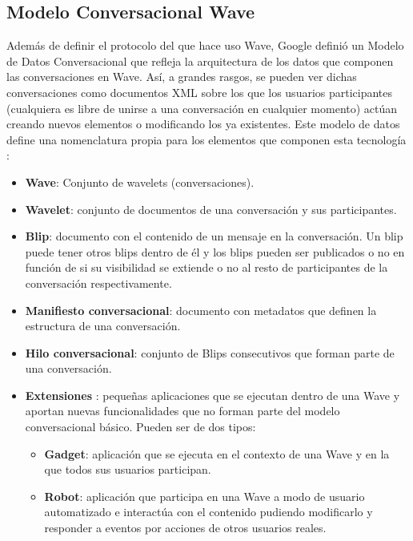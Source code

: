     \subsection{Modelo Conversacional Wave}\label{ssec:waveModel}
    
    Además de definir el protocolo del que hace uso Wave, Google definió un Modelo de Datos Conversacional \cite{ref:wave_conversation_model} que refleja la arquitectura de los datos que componen las conversaciones en Wave. Así, a grandes rasgos, se pueden ver dichas conversaciones como documentos XML sobre los que los usuarios participantes (cualquiera es libre de unirse a una conversación en cualquier momento) actúan creando nuevos elementos o modificando los ya existentes. Este modelo de datos define una nomenclatura propia para los elementos que componen esta tecnología \cite{ref:wave_api_overview} \cite{ref:wave_white_paper}:
    
      \begin{itemize}
	\item \textbf{Wave}: Conjunto de wavelets (conversaciones).
	\item \textbf{Wavelet}: conjunto de documentos de una conversación y sus participantes.
	\item \textbf{Blip}: documento con el contenido de un mensaje en la conversación. Un blip puede tener otros blips dentro de él y los blips pueden ser publicados o no en función de si su visibilidad se extiende o no al resto de participantes de la conversación respectivamente.
	\item \textbf{Manifiesto conversacional}: documento con metadatos que definen la estructura de una conversación. 
	\item \textbf{Hilo conversacional}: conjunto de Blips consecutivos que forman parte de una conversación.
	\item \textbf{Extensiones} \cite{ref:wave_extensions}: pequeñas aplicaciones que se ejecutan dentro de una Wave y aportan nuevas funcionalidades que no forman parte del modelo conversacional básico. Pueden ser de dos tipos:
	  \begin{itemize}
	    \item \textbf{Gadget}: aplicación que se ejecuta en el contexto de una Wave y en la que todos sus usuarios participan.
	    \item \textbf{Robot}: aplicación que participa en una Wave a modo de usuario automatizado e interactúa con el contenido pudiendo modificarlo y responder a eventos por acciones de otros usuarios reales.
	  \end{itemize}
      \end{itemize}
      
